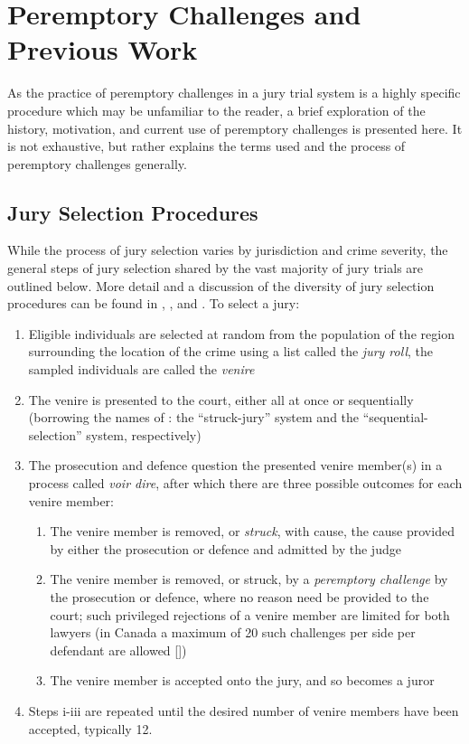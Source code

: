 \section{Peremptory Challenges and Previous Work} \label{c:background}

As the practice of peremptory challenges in a jury trial system is a highly specific procedure which may be unfamiliar to the
reader, a brief exploration of the history, motivation, and current use of peremptory challenges is presented here. It is not
exhaustive, but rather explains the terms used and the process of peremptory challenges generally.

\subsection{Jury Selection Procedures} \label{sec:jurysel}

While the process of jury selection varies by jurisdiction and crime severity, the general steps of jury selection shared by the
vast majority of jury trials are outlined below. More detail and a discussion of the diversity of jury selection procedures can be
found in \cite{ford2010}, \cite{hansvidjudging}, and \cite{vandykejurysel}. To select a jury:

\begin{enumerate}
  \item Eligible individuals are selected at random from the population of the region surrounding the location of the crime using
    a list called the \textit{jury roll}, the sampled individuals are called the \textit{venire}
  \item The venire is presented to the court, either all at once or sequentially (borrowing the names of \cite{ford2010}: the
    ``struck-jury'' system and the ``sequential-selection'' system, respectively)
  \item The prosecution and defence question the presented venire member(s) in a process called \textit{voir dire}, after which there are three possible
    outcomes for each venire member:
    \begin{enumerate}
      \item The venire member is removed, or \textit{struck}, with cause, the cause provided by either the prosecution or defence and admitted by
        the judge
      \item The venire member is removed, or struck, by a \textit{peremptory challenge} by the prosecution or defence, where no reason
        need be provided to the court; such privileged rejections of a venire member are limited for both lawyers (in
        Canada a maximum of 20 such challenges per side per defendant are allowed [\cite{perempchallaw}])
      \item The venire member is accepted onto the jury, and so becomes a juror
    \end{enumerate}
  \item Steps i-iii are repeated until the desired number of venire members have been accepted, typically 12.
\end{enumerate}

